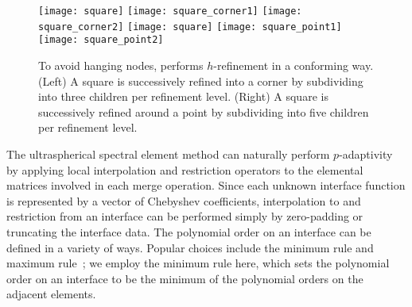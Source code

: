 \begin{figure}[htb]
  \centering
  \texttt{[image: square]}
  \hspace{0.4cm}
  \texttt{[image: square\_corner1]}
  \hspace{0.4cm}
  \texttt{[image: square\_corner2]}
  \hspace{2cm}
  \texttt{[image: square]}
  \hspace{0.4cm}
  \texttt{[image: square\_point1]}
  \hspace{0.4cm}
  \texttt{[image: square\_point2]}
  \vspace{0.5em}
  \caption{To avoid hanging nodes, \ultraSEM performs $h$-refinement in a conforming way. (Left)  A square is successively refined into a corner by subdividing into three children per refinement level. (Right) A square is successively refined around a point by subdividing into five children per refinement level.}
  \label{fig:\chap:corner_point_refinement}
\end{figure}

The ultraspherical spectral element method can naturally perform $p$-adaptivity by applying local interpolation and restriction operators to the elemental matrices involved in each merge operation. Since each unknown interface function is represented by a vector of Chebyshev coefficients, interpolation to and restriction from an interface can be performed simply by zero-padding or truncating the interface data. The polynomial order on an interface can be defined in a variety of ways. Popular choices include the minimum rule and maximum rule~\cite{Demkowicz_06_01}; we employ the minimum rule here, which sets the polynomial order on an interface to be the minimum of the polynomial orders on the adjacent elements.

